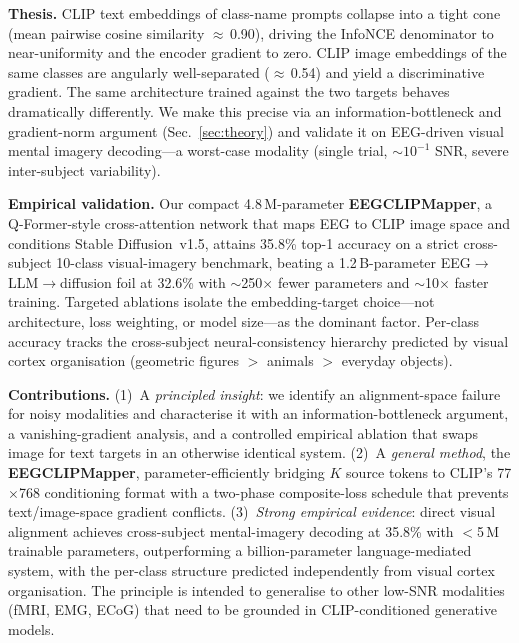 \documentclass{article}
\begin{document}
\textbf{Thesis.} CLIP text embeddings of class-name prompts collapse into a tight cone (mean pairwise cosine similarity $\approx$\,0.90), driving the InfoNCE denominator to near-uniformity and the encoder gradient to zero. CLIP image embeddings of the same classes are angularly well-separated ($\approx$\,0.54) and yield a discriminative gradient. The same architecture trained against the two targets behaves dramatically differently. We make this precise via an information-bottleneck and gradient-norm argument (Sec.~\ref{sec:theory}) and validate it on EEG-driven visual mental imagery decoding---a worst-case modality (single trial, $\sim$$10^{-1}$ SNR, severe inter-subject variability).

\textbf{Empirical validation.} Our compact 4.8\,M-parameter \textbf{EEGCLIPMapper}, a Q-Former-style cross-attention network that maps EEG to CLIP image space and conditions Stable Diffusion~v1.5, attains 35.8\% top-1 accuracy on a strict cross-subject 10-class visual-imagery benchmark, beating a 1.2\,B-parameter EEG$\to$LLM$\to$diffusion foil at 32.6\% with $\sim$250$\times$ fewer parameters and $\sim$10$\times$ faster training. Targeted ablations isolate the embedding-target choice---not architecture, loss weighting, or model size---as the dominant factor. Per-class accuracy tracks the cross-subject neural-consistency hierarchy predicted by visual cortex organisation (geometric figures $>$ animals $>$ everyday objects).

\textbf{Contributions.} (1)~A \emph{principled insight}: we identify an alignment-space failure for noisy modalities and characterise it with an information-bottleneck argument, a vanishing-gradient analysis, and a controlled empirical ablation that swaps image for text targets in an otherwise identical system. (2)~A \emph{general method}, the \textbf{EEGCLIPMapper}, parameter-efficiently bridging $K$ source tokens to CLIP's 77$\times$768 conditioning format with a two-phase composite-loss schedule that prevents text/image-space gradient conflicts. (3)~\emph{Strong empirical evidence}: direct visual alignment achieves cross-subject mental-imagery decoding at 35.8\% with $<$5\,M trainable parameters, outperforming a billion-parameter language-mediated system, with the per-class structure predicted independently from visual cortex organisation. The principle is intended to generalise to other low-SNR modalities (fMRI, EMG, ECoG) that need to be grounded in CLIP-conditioned generative models.

\end{document}
